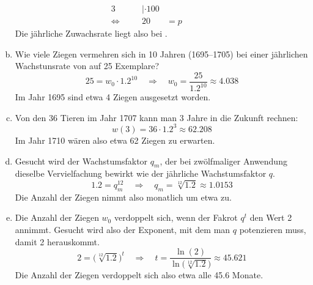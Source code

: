 \begin{exercise}
\begin{enumerate}[a)]
\begin{alignat*}{3}
              &
              \quad&|\cdot100
              \\[1ex]
              \Leftrightarrow&\quad
              &
              20&=p
              &
              \quad&\quad
            \end{alignat*}
            Die jährliche Zuwachsrate liegt also bei .
      \item Wie viele Ziegen vermehren sich in 10 Jahren
            (1695--1705) bei einer jährlichen Wachstunsrate von
             auf 25 Exemplare?
            \begin{equation*}
              25=w_0\cdot\num{1.2}^{10}
              \quad\Rightarrow\quad
              w_0=\frac{25}{\num{1.2}^{10}}
              \approx\num{4.038}
            \end{equation*}
            Im Jahr 1695 sind etwa 4 Ziegen ausgesetzt worden.
      \item Von den 36 Tieren im Jahr 1707 kann man 3 Jahre
            in die Zukunft rechnen:
            \begin{equation*}
              w(3)=36\cdot\num{1.2}^3\approx\num{62.208}
            \end{equation*}
            Im Jahr 1710 wären also etwa 62 Ziegen zu erwarten.
      \item Gesucht wird der Wachstumsfaktor $q_m$, der bei
            zwölfmaliger Anwendung dieselbe Vervielfachung
            bewirkt wie der jährliche Wachstumsfaktor $q$.
            \begin{equation*}
              \num{1.2}=q_m^{12}
              \quad\Rightarrow\quad
              q_m=\sqrt[12]{\num{1.2}}
              \approx\num{1.0153}
            \end{equation*}
            Die Anzahl der Ziegen nimmt also monatlich
            um etwa  zu.
      \item Die Anzahl der Ziegen $w_0$ verdoppelt sich, wenn
            der Fakrot $q^t$ den Wert 2 annimmt.
            Gesucht wird also der Exponent, mit dem man $q$
            potenzieren muss, damit 2 herauskommt.
            \begin{equation*}
              2=\big(\sqrt[12]{\num{1.2}}\big)^t
              \quad\Rightarrow\quad
              t=\frac{\ln(2)}{\ln\big(\sqrt[12]{\num{1.2}}\big)}
              \approx\num{45.621}
            \end{equation*}
            Die Anzahl der Ziegen verdoppelt sich also etwa alle \num{45.6} Monate.
    \end{enumerate}
  \fi
\end{exercise}
